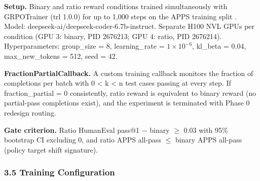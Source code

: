 \textbf{Setup.} Binary and ratio reward conditions trained simultaneously with GRPOTrainer (trl 1.0.0) for up to 1,000 steps on the APPS training split \citep{Hendrycks2021APPS}. Model: deepseek-ai/deepseek-coder-6.7b-instruct. Separate H100 NVL GPUs per condition (GPU 3: binary, PID 2676213; GPU 4: ratio, PID 2676214). Hyperparameters: group\_size = 8, learning\_rate = $1\times 10^{-6}$, kl\_beta = 0.04, max\_new\_tokens = 512, seed = 42.

\textbf{FractionPartialCallback.} A custom training callback monitors the fraction of completions per batch with 0 < k < n test cases passing at every step. If fraction\_partial = 0 consistently, ratio reward is equivalent to binary reward (no partial-pass completions exist), and the experiment is terminated with Phase 0 redesign routing.

\textbf{Gate criterion.} Ratio HumanEval pass@1 $-$ binary $\geq$ 0.03 with 95\% bootstrap CI excluding 0, and ratio APPS all-pass $\leq$ binary APPS all-pass (policy target shift signature).

\subsubsection{3.5 Training Configuration}

\begin{table}[htbp]
\centering
{}
\end{table}

